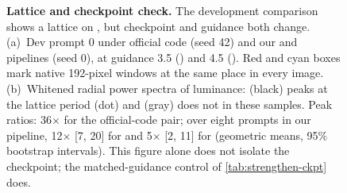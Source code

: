\begin{figure}[H]
\centering
{}
\caption{\textbf{Lattice and checkpoint check.} The development comparison shows a lattice on \fluxdev{}, but checkpoint and guidance both change. (a)~Dev prompt 0 under official \dype{} code (seed 42) and our \dype{} and \segaofficial{} pipelines (seed 0), at guidance 3.5 (\fluxdev) and 4.5 (\krea). Red and cyan boxes mark native 192-pixel windows at the same place in every image. (b)~Whitened radial power spectra of luminance: \fluxdev{} (black) peaks at the lattice period (dot) and \krea{} (gray) does not in these samples. Peak ratios: 36$\times$ for the official-code pair; over eight prompts in our pipeline, 12$\times$ [7, 20] for \dype{} and 5$\times$ [2, 11] for \segaofficial{} (geometric means, 95\% bootstrap intervals). This figure alone does not isolate the checkpoint; the matched-guidance control of \cref{tab:strengthen-ckpt} does.}
\label{fig:checkpoint}
\end{figure}
